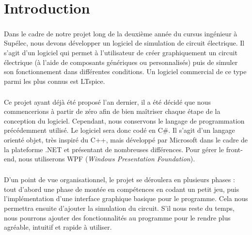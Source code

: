 \chapter*{Introduction}

\paragraph{}Dans le cadre de notre projet long de la deuxième année du cursus ingénieur à Supélec, nous devons développer un logiciel de simulation de circuit électrique. Il s'agit d'un logiciel qui permet à l'utilisateur de créer graphiquement un circuit électrique (à l'aide de composants génériques ou personnalisés) puis de simuler son fonctionnement dans différentes conditions. Un logiciel commercial de ce type parmi les plus connus est LTspice.

\paragraph{}Ce projet ayant déjà été proposé l'an dernier, il a été décidé que nous commencerions à partir de zéro afin de bien maîtriser chaque étape de la conception du logiciel. Cependant, nous conservons le langage de programmation précédemment utilisé. Le logiciel sera donc codé en C\#. Il s'agit d'un langage orienté objet, très inspiré du C++, mais développé par Microsoft dans le cadre de la plateforme .NET et présentant de nombreuses différences. Pour gérer le front-end, nous utiliserons WPF (\textit{Windows Presentation Foundation}).

\paragraph{}D'un point de vue organisationnel, le projet se déroulera en plusieurs phases : tout d'abord une phase de montée en compétences en codant un petit jeu, puis l'implémentation d'une interface graphique basique pour le programme. Cela nous permettra ensuite d'ajouter la simulation du circuit. S'il nous reste du temps, nous pourrons ajouter des fonctionnalités au programme pour le rendre plus agréable, intuitif et rapide à utiliser.


